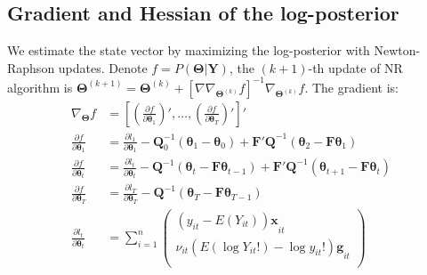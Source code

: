 \documentclass[aoas]{imsart}
\theoremstyle{plain}
\theoremstyle{remark}
\begin{document}
\begin{appendix}
\section{Gradient and Hessian of the log-posterior}\label{appC}
We estimate the state vector by maximizing the log-posterior with Newton-Raphson updates. Denote $f = P(\bm{\Theta|Y})$, the $(k+1)$-th update of NR algorithm is $\bm{\Theta}^{(k+1)} = \bm{\Theta}^{(k)} + [\nabla\nabla_{\bm{\Theta}^{(k)}}f]^{-1}\nabla_{\bm{\Theta}^{(k)}}f$. 
The gradient is:
\begin{align}
	\nabla_{\bm{\Theta}}f &= \left[\left(\frac{\partial f}{\partial \bm{\theta}_1}\right)',\ldots,\left(\frac{\partial f}{\partial \bm{\theta}_T}\right)'\right]'\\
	\frac{\partial f}{\partial\bm{\theta}_1} &= \frac{\partial l_1}{\partial\bm{\theta}_1} -  \bm{Q}_0^{-1}(\bm{\theta}_1 - \bm{\theta}_0)   +  \bm{F'Q}^{-1}(\bm{\theta}_2 - \bm{F\theta}_{1}) \nonumber\\
	\frac{\partial f}{\partial\bm{\theta}_t} &= \frac{\partial l_t}{\partial\bm{\theta}_t} -  \bm{Q}^{-1}(\bm{\theta}_t - \bm{F\theta}_{t-1})   +  \bm{F'Q}^{-1}(\bm{\theta}_{t+1} - \bm{F\theta}_{t}) \nonumber\\
	\frac{\partial f}{\partial\bm{\theta}_T} &= \frac{\partial l_T}{\partial\bm{\theta}_T} -  \bm{Q}^{-1}(\bm{\theta}_T - \bm{F\theta}_{T-1})    \nonumber\\
	\frac{\partial l_t}{\partial\bm{\theta}_t} &= \sum_{i = 1}^{n}\begin{pmatrix}
		{\left( y_{it} - E\left( Y_{it} \right) \right)\bm{x}}_{it} \\
		{\nu_{it}\left( E\left( \log{Y_{it}!} \right) - \log{y_{it}!} \right)\bm{g}}_{it} \\
	\end{pmatrix} \nonumber
\end{align}


\end{appendix}
\end{document}
